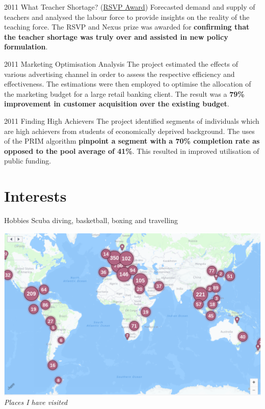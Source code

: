 \documentclass{tccv}
\begin{document}
\begin{yearlist}

\item{2011} {What Teacher Shortage?
  (\href{http://nzdmawards.co.nz/winners-archive/2011-winners-gallery/ministry-of-education-what-teacher-shortage}{RSVP
    Award})} {Forecasted demand and supply of teachers and analysed
  the labour force to provide insights on the reality of the teaching
  force. The RSVP and Nexus prize was awarded for \textbf{confirming
    that the teacher shortage was truly over and assisted in new
    policy formulation}.}

  
\item{2011} {Marketing Optimisation Analysis} {The project estimated the effects of
  various advertising channel in order to assess the respective
  efficiency and effectiveness. The estimations were then employed to
  optimise the allocation of the marketing budget for a large retail
  banking client. The result was a \textbf{79\% improvement in
    customer acquisition over the existing budget}.}


\item{2011}
     {Finding High Achievers}
     {The project identified segments of individuals which are high
       achievers from students of economically deprived
       background. The uses of the PRIM algorithm \textbf{pinpoint a
         segment with a 70\% completion rate as opposed to the pool
         average of 41\%}. This resulted in improved utilisation of
       public funding.}
  
\end{yearlist}


\section{Interests}

\begin{factlist}
\item{Hobbies} {Scuba diving, basketball, boxing and travelling}
\end{factlist}

\FloatBarrier
  \centering
  \includegraphics[scale = 0.2]{places_I_have_been_2.png}
  \textit{Places I have visited}
\FloatBarrier
\end{document}
